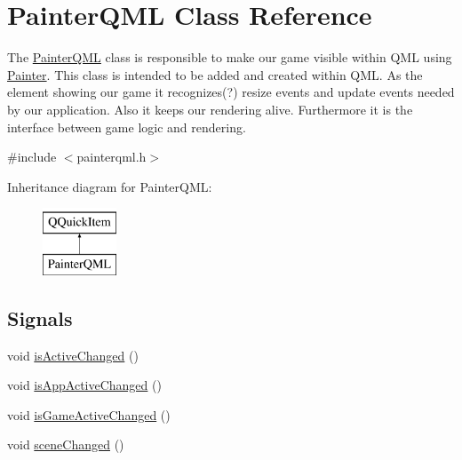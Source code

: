 \hypertarget{class_painter_q_m_l}{}\section{Painter\+Q\+M\+L Class Reference}
\label{class_painter_q_m_l}


The \hyperlink{class_painter_q_m_l}{Painter\+Q\+M\+L} class is responsible to make our game visible within Q\+M\+L using \hyperlink{class_painter}{Painter}.  This class is intended to be added and created within Q\+M\+L. As the element showing our game it recognizes(?) resize events and update events needed by our application. Also it keeps our rendering alive. Furthermore it is the interface between game logic and rendering.  




{\ttfamily \#include $<$painterqml.\+h$>$}

Inheritance diagram for Painter\+Q\+M\+L\+:\begin{figure}[H]
\begin{center}
\leavevmode
\includegraphics[height=2.000000cm]{class_painter_q_m_l}
\end{center}
\end{figure}
\subsection*{Signals}
\begin{DoxyCompactItemize}
\item 
void \hyperlink{class_painter_q_m_l_a9143d84bcf1b2c150c28983459916a70}{is\+Active\+Changed} ()
\item 
void \hyperlink{class_painter_q_m_l_a4f2212d4a85e7844c2c7c02ebc5bcf49}{is\+App\+Active\+Changed} ()
\item 
void \hyperlink{class_painter_q_m_l_a46f7374519937259609441c88a3b8b9f}{is\+Game\+Active\+Changed} ()
\item 
void \hyperlink{class_painter_q_m_l_a5fce3441beea885f9ba2a70b2f21f0ae}{scene\+Changed} ()
\end{DoxyCompactItemize}
